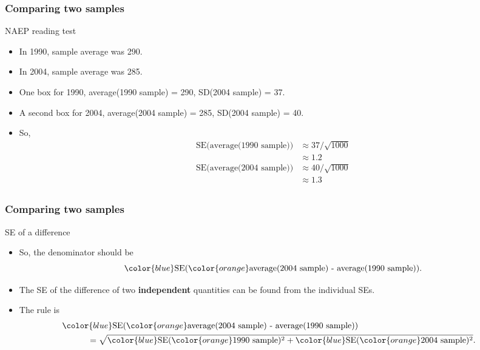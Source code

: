 \documentclass[handout]{beamer}
\begin{document}
   \begin{frame} \frametitle{Comparing two samples}

   \begin{block}
   {NAEP reading test}
   \begin{itemize}
   \item In 1990, sample average was 290.

   \item In 2004, sample average was 285.

   \item One box for 1990, average(1990 sample) = 290, SD(2004 sample) = 37.

   \item A second box for 2004, average(2004 sample) = 285, SD(2004 sample) = 40.

   \item So,
   $$
   \begin{aligned}
   \text{SE(average(1990 sample))} &\approx 37 / \sqrt{1000} \\
    &\approx 1.2\\
   \text{SE(average(2004 sample))} &\approx 40 / \sqrt{1000} \\
   &\approx 1.3\\
   \end{aligned}
   $$

   \end{itemize}
   \end{block}
   \end{frame}


   \begin{frame} \frametitle{Comparing two samples}

   \begin{block}
   {SE of a difference}
   \begin{itemize}

   \item So, the denominator should be
   $$
   {\color{blue} \text{SE}}({\color{orange} \text{average(2004 sample) -
   average(1990 sample)}}).
   $$

   \item The SE of the difference of two {\bf independent}
   quantities can be found from the individual SEs.

   \item The rule is
   $$
   \begin{aligned}
   \lefteqn{{\color{blue} \text{SE}}({\color{orange}
   \text{average(2004 sample) -
   average(1990 sample)}})} \\
   & \qquad \quad = \sqrt{{\color{blue}\text{SE}}({\color{orange} \text{1990 sample}})^2 + {\color{blue}\text{SE}}({\color{orange} \text{2004 sample}})^2}.
   \end{aligned}
   $$

   \end{itemize}
   \end{block}
   \end{frame}
\end{document}
